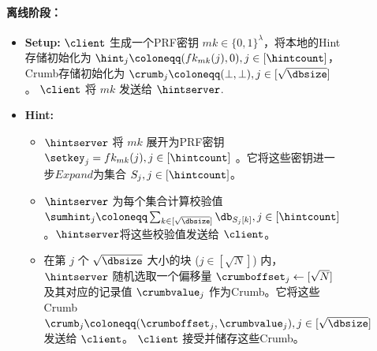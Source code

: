 \begin{figure}
\begin{mdframed}
        \paragraph{离线阶段：}
        \begin{itemize}
            \item \textbf{Setup:} $\client$ 生成一个PRF密钥 $mk\in\{0,1\}^\lambda$，将本地的Hint存储初始化为 $\hint_j\coloneqq(fk_{mk}(j),0), j\in [\hintcount]$，Crumb存储初始化为 $\crumb_j\coloneqq (\bot,\bot), j\in [\sqrt{\dbsize}]$。 $\client$ 将 $mk$ 发送给 $\hintserver$.
            \item \textbf{Hint:}
                  \begin{itemize}
                      \item $\hintserver$ 将 $mk$ 展开为PRF密钥 $\setkey_j=fk_{mk}(j), j\in[\hintcount]$ 。它将这些密钥进一步$Expand$为集合 $S_j, j\in[\hintcount]$。
                      \item $\hintserver$ 为每个集合计算校验值 $\sumhint_j\coloneqq \sum_{k\in [\sqrt{\dbsize}]}\db_{S_{j}[k]}, j\in[\hintcount]$ 。$\hintserver$将这些校验值发送给 $\client$。
                      \item 在第 $j$ 个 $\sqrt{\dbsize}$ 大小的块 ($j\in[\sqrt{N}]$) 内， $\hintserver$ 随机选取一个偏移量 $\crumboffset_j\leftarrow [\sqrt{N}]$ 及其对应的记录值 $\crumbvalue_j$ 作为Crumb。它将这些Crumb $\crumb_j \coloneqq  (\crumboffset_j, \crumbvalue_j), j\in [\sqrt{\dbsize}]$ 发送给 $\client$。 $\client$ 接受并储存这些Crumb。
                  \end{itemize}
        \end{itemize}

\end{mdframed}
\end{figure}

